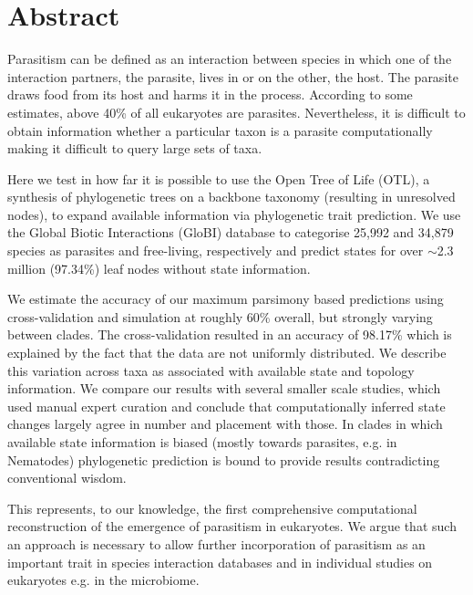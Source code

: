 \chapter*{Abstract}

  Parasitism can be defined as an interaction between species in which one of the interaction 
    partners, the parasite, lives in or on the other, the host. The parasite draws food from its 
    host and harms it in the process. According to some estimates, above 40\% of all eukaryotes are 
    parasites. Nevertheless, it is difficult to obtain information whether a particular taxon is a 
    parasite computationally making it difficult to query large sets of taxa.

  Here we test in how far it is possible to use the Open Tree of Life (OTL), a synthesis of 
    phylogenetic trees on a backbone taxonomy (resulting in unresolved nodes), to expand available 
    information via phylogenetic trait prediction. We use the Global Biotic Interactions (GloBI) 
    database to categorise 25,992 and 34,879 species as parasites and free-living, respectively and 
    predict states for over $\sim$2.3 million (97.34\%) leaf nodes without state information.

  We estimate the accuracy of our maximum parsimony based predictions using cross-validation and 
    simulation at roughly 60\% overall, but strongly varying between clades. The cross-validation 
    resulted in an accuracy of 98.17\% which is explained by the fact that the data are not 
    uniformly distributed. We describe this variation across taxa as associated with available state 
    and topology information. We compare our results with several smaller scale studies, which used 
    manual expert curation and conclude that computationally inferred state changes largely agree in 
    number and placement with those. In clades in which available state information is biased 
    (mostly towards parasites, e.g. in Nematodes) phylogenetic prediction is bound to provide 
    results contradicting conventional wisdom.

  This represents, to our knowledge, the first comprehensive computational reconstruction of the 
    emergence of parasitism in eukaryotes. We argue that such an approach is necessary to allow 
    further incorporation of parasitism as an important trait in species interaction databases and 
    in individual studies on eukaryotes e.g. in the microbiome.

